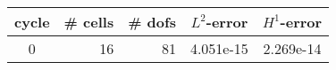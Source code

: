 \documentclass[10pt]{report}
\begin{document}
\begin{table}[H]
\begin{center}
\begin{tabular}{|c|r|r|c|c|} \hline
cycle & \# cells & \# dofs & $L^2$-error & $H^1$-error\\ \hline
0 & 16 & 81 & 4.051e-15 & 2.269e-14\\ \hline
\end{tabular}
\end{center}
\end{table}
\end{document}
